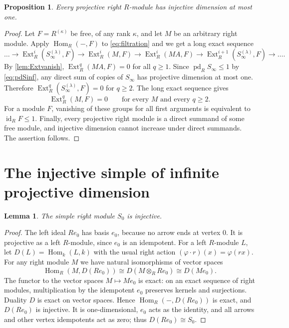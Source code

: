 \documentclass[11pt]{amsart}
\newtheorem{lemma}[theorem]{Lemma}
\newtheorem{proposition}[theorem]{Proposition}
\theoremstyle{definition}
\theoremstyle{remark}
\newcommand{\pd}{\operatorname{pd}}
\newcommand{\idim}{\operatorname{id}}
\newcommand{\Ext}{\operatorname{Ext}}
\newcommand{\Hom}{\operatorname{Hom}}
\begin{document}
\begin{proposition}\label{prop:upper}
Every projective right $R$-module has injective dimension at most one.
\end{proposition}
\begin{proof}
Let $F=R^{(\kappa)}$ be free, of any rank $\kappa$, and let $M$ be an arbitrary right module. Apply $\Hom_R(-,F)$ to \eqref{eq:filtration} and we get a long exact sequence\[
\dots\longrightarrow\Ext_R^i(S_\infty^{(\lambda)},F)\longrightarrow \Ext_R^i(M,F)\longrightarrow \Ext_R^i(MA,F)\longrightarrow \Ext_R^{i+1}(S_\infty^{(\lambda)},F)\longrightarrow\dots.
\] By \cref{lem:Extvanish}, $\Ext_R^q(MA,F)=0$ for all $q\geq1$. Since $\pd_R S_\infty\leq1$ by \eqref{eq:pdSinf}, any direct sum of copies of $S_\infty$ has projective dimension at most one. Therefore $\Ext_R^q(S_\infty^{(\lambda)},F)=0$ for $q\geq2$. The long exact sequence gives
\[
\Ext_R^q(M,F)=0\qquad\text{for every }M\text{ and every }q\geq2.
\]
For a module $F$, vanishing of these groups for all first arguments is equivalent to $\idim_R F\leq1$. Finally, every projective right module is a direct summand of some free module, and injective dimension cannot increase under direct summands. The assertion follows.
\end{proof}

\section{The injective simple of infinite projective dimension}\label{sec:infinite}
\begin{lemma}\label{lem:injective}
The simple right module $S_0$ is injective.
\end{lemma}
\begin{proof}
The left ideal $Re_0$ has basis $e_0$, because no arrow ends at vertex $0$. It is projective as a left $R$-module, since $e_0$ is an idempotent. For a left $R$-module $L$, let $D(L)=\Hom_k(L,k)$ with the usual right action $(\varphi\cdot r)(x)=\varphi(rx)$. For any right module $M$ we have natural isomorphisms of vector spaces
\[
\Hom_R(M,D(Re_0))\cong D(M\otimes_R Re_0)\cong D(Me_0).
\]
The functor to the vector spaces $M\mapsto Me_0$ is exact: on an exact sequence of right modules, multiplication by the idempotent $e_0$ preserves kernels and surjections. Duality $D$ is exact on vector spaces. Hence $\Hom_R(-,D(Re_0))$ is exact, and $D(Re_0)$ is injective. It is one-dimensional, $e_0$ acts as the identity, and all arrows and other vertex idempotents act as zero; thus $D(Re_0)\cong S_0$.
\end{proof}
\end{document}
